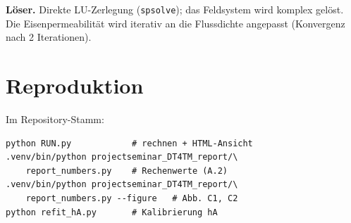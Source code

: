 \documentclass[a4paper, 10pt, conference]{ieeeconf}
\newcommand{\anh}[1]{\par\medskip\noindent\textbf{#1}\quad}
\begin{document}
\anh{Löser.} Direkte LU-Zerlegung (\texttt{spsolve}); das Feldsystem wird
komplex gelöst. Die Eisenpermeabilität wird iterativ an die Flussdichte
angepasst (Konvergenz nach 2 Iterationen).

\section{Reproduktion}
\label{app:repro}

Im Repository-Stamm:
{\footnotesize
\begin{verbatim}
python RUN.py            # rechnen + HTML-Ansicht
.venv/bin/python projectseminar_DT4TM_report/\
    report_numbers.py    # Rechenwerte (A.2)
.venv/bin/python projectseminar_DT4TM_report/\
    report_numbers.py --figure   # Abb. C1, C2
python refit_hA.py       # Kalibrierung hA
\end{verbatim}
}

\makeatletter
\let\@origthebib\thebibliography
\def\thebibliography#1{\let\@origsection\section
  \def\section*##1{\@origsection*{Literatur}}\@origthebib{#1}\let\section\@origsection}
\makeatother


\end{document}
